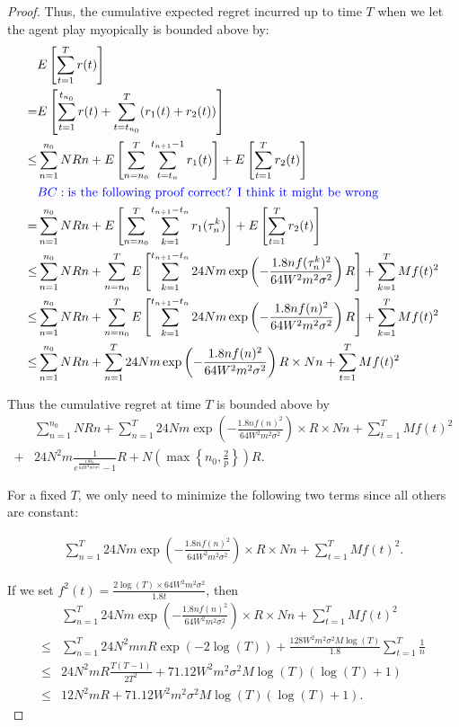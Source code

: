 \documentclass{article}
\newcommand{\bccomment}[1]{{\color{blue}BC: #1}}
\begin{document}
\begin{proof}
Thus, the cumulative expected regret incurred up to time $T$ when we let the agent play myopically is bounded above by:
\begin{align}
&E\left[\sum_{t=1}^{T}r(t)\right] \nonumber \\
=&E\left[\sum_{t=1}^{t_{n_{0}}} r(t) + \sum_{t=t_{n_{0}}}^{T}(r_1(t)+r_2(t))\right]  \nonumber \\
\leq & \sum_{n=1}^{n_{0}}NRn + E\left[\sum_{n=n_{0}}^{T}\sum_{t=t_{n}}^{t_{n+1}-1}r_1(t)\right]+ E\left[\sum_{t=1}^{T}r_2(t)\right] \nonumber \\
&\bccomment{\text{is the following proof correct? I think it might be wrong}} \nonumber \\
= & \sum_{n=1}^{n_{0}}NRn + E\left[\sum_{n=n_{0}}^{T}\sum_{k=1}^{t_{n+1}-t_{n}}r_1(\tau_{n}^{k})\right]+ E\left[\sum_{t=1}^{T}r_2(t)\right] \nonumber \\
\leq & \sum_{n=1}^{n_{0}}NRn + \sum_{n=n_{0}}^{T}E\left[\sum_{k=1}^{t_{n+1}-t_n}24Nm\exp\left(-\frac{1.8n f(\tau_{n}^{k})^2}{64 W^2 m^2\sigma^2}\right) R\right]+ \sum_{k=1}^{T}Mf(t)^2 \nonumber \\
\leq & \sum_{n=1}^{n_{0}}NRn + \sum_{n=n_{0}}^{T}E\left[\sum_{k=1}^{t_{n+1}-t_n}24Nm\exp\left(-\frac{1.8n f(n)^2}{64 W^2 m^2\sigma^2}\right) R\right]+ \sum_{k=1}^{T}Mf(t)^2 \nonumber \\
\leq & \sum_{n=1}^{n_{0}}NRn + \sum_{n=1}^{T} 24Nm\exp\left(-\frac{1.8n f(n)^2}{64 W^2 m^2\sigma^2}\right) R \times Nn+ \sum_{t=1}^{T}Mf(t)^2 \label{equ:regret}
\end{align}

 Thus the cumulative regret at time $T$ is bounded above by
\begin{align}
&\sum_{n=1}^{n_{0}}NRn + \sum_{n=1}^{T} 24Nm\exp\left(-\frac{1.8n f(n)^2}{64 W^2 m^2\sigma^2}\right)\times R \times Nn+ \sum_{t=1}^{T}Mf(t)^2 \nonumber \\
+ & 24N^2 m \frac{1}{e^{\frac{1.8\delta_{0}}{64W^2 m^2\sigma^2}}-1}R+N\left(\max\left\{n_{0},\frac{2}{p}\right\}\right)R. \nonumber
\end{align}

For a fixed $T$, we only need to minimize the following two terms since all others are constant:

\begin{align}
\sum_{n=1}^{T} 24Nm\exp\left(-\frac{1.8n f(n)^2}{64 W^2 m^2\sigma^2}\right)\times R \times Nn+ \sum_{t=1}^{T}Mf(t)^2.
\end{align}


If we set $f^2(t)=\frac{2\log(T)\times 64W^2 m^2\sigma^2}{1.8t}$, then
\begin{align}
&\sum_{n=1}^{T} 24Nm\exp\left(-\frac{1.8n f(n)^2}{64 W^2 m^2\sigma^2}\right)\times R \times Nn+ \sum_{t=1}^{T}Mf(t)^2 \nonumber \\ 
\leq & \sum_{n=1}^{T} 24N^2 mnR \exp\left(-2\log(T)\right)  + \frac{128W^2 m^2\sigma^2 M\log(T)}{1.8}\sum_{t=1}^{T}\frac{1}{n} \nonumber \\
\leq &  24N^2 m R\frac{T(T-1)}{2T^2}  + 71.12 W^2 m^2\sigma^2 M\log(T)(\log(T)+1) \nonumber \\
\leq &  12 N^2 m R  + 71.12 W^2 m^2\sigma^2 M\log(T)(\log(T)+1). \nonumber
\end{align}


\end{proof}
\end{document}
